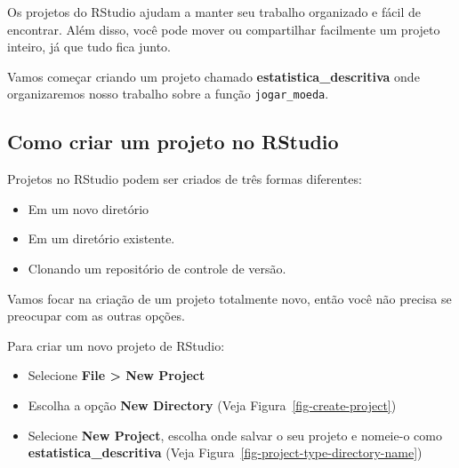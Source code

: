 \documentclass[
  letterpaper,
]{book}
\providecommand{\tightlist}{%
  \setlength{\itemsep}{0pt}\setlength{\parskip}{0pt}}\usepackage{longtable,booktabs,array}
\theoremstyle{definition}
\theoremstyle{plain}
\theoremstyle{remark}
\begin{document}
Os projetos do RStudio ajudam a manter seu trabalho organizado e fácil
de encontrar. Além disso, você pode mover ou compartilhar facilmente um
projeto inteiro, já que tudo fica junto.

Vamos começar criando um projeto chamado
\textbf{estatistica\_descritiva} onde organizaremos nosso trabalho sobre
a função \texttt{jogar\_moeda}.

\subsection{Como criar um projeto no
RStudio}\label{como-criar-um-projeto-no-rstudio}

Projetos no RStudio podem ser criados de três formas diferentes:

\begin{itemize}
\tightlist
\item
  Em um novo diretório
\item
  Em um diretório existente.
\item
  Clonando um repositório de controle de versão.
\end{itemize}

Vamos focar na criação de um projeto totalmente novo, então você não
precisa se preocupar com as outras opções.

Para criar um novo projeto de RStudio:

\begin{itemize}
\tightlist
\item
  Selecione \textbf{File \textgreater{} New Project}
\item
  Escolha a opção \textbf{New Directory} (Veja
  Figura~\ref{fig-create-project})
\item
  Selecione \textbf{New Project}, escolha onde salvar o seu projeto e
  nomeie-o como \textbf{estatistica\_descritiva} (Veja
  Figura~\ref{fig-project-type-directory-name})
\end{itemize}
\end{document}

